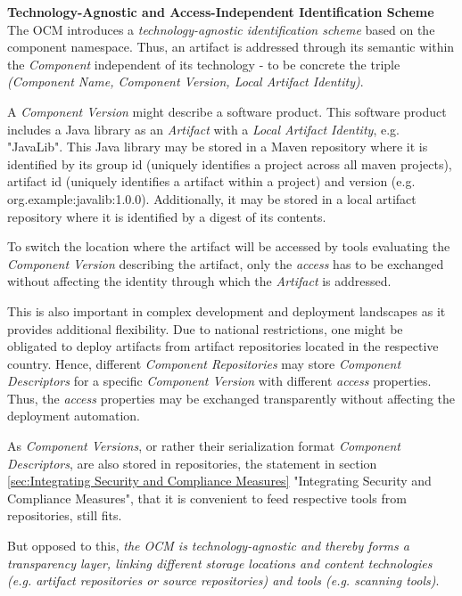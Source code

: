 \noindent\textbf{Technology-Agnostic and Access-Independent Identification Scheme}\\
The OCM introduces a \emph{technology-agnostic identification scheme} based on the component namespace. Thus, an artifact is addressed through its semantic within the \emph{Component} independent of its technology - to be concrete the triple \emph{({Component Name}, {Component Version}, {Local Artifact Identity})}.\par
A \emph{Component Version} might describe a software product. This software product includes a Java library as an \emph{Artifact} with a \emph{Local Artifact Identity}, e.g. "JavaLib". This Java library may be stored in a Maven repository where it is identified by its group id (uniquely identifies a project across all maven projects), artifact id (uniquely identifies a artifact within a project) and version (e.g. org.example:javalib:1.0.0). Additionally, it may be stored in a local artifact repository where it is identified by a digest of its contents.\par
To switch the location where the artifact will be accessed by tools evaluating the \emph{Component Version} describing the artifact, only the \emph{access} has to be exchanged without affecting the identity through which the \emph{Artifact} is addressed.\par 
This is also important in complex development and deployment landscapes as it provides additional flexibility. Due to national restrictions, one might be obligated to deploy artifacts from artifact repositories located in the respective country. Hence, different \emph{Component Repositories} may store \emph{Component Descriptors} for a specific \emph{Component Version} with different \emph{access} properties. Thus, the \emph{access} properties may be exchanged transparently without affecting the deployment automation.\par
As \emph{Component Versions}, or rather their serialization format \emph{Component Descriptors}, are also stored in repositories, the statement in section \ref{sec:Integrating Security and Compliance Measures} "Integrating Security and Compliance Measures", that it is convenient to feed respective tools from repositories, still fits.\par
But opposed to this, \emph{the OCM is technology-agnostic and thereby forms a transparency layer, linking different storage locations and content technologies (e.g. artifact repositories or source repositories) and tools (e.g. scanning tools)}.\\

